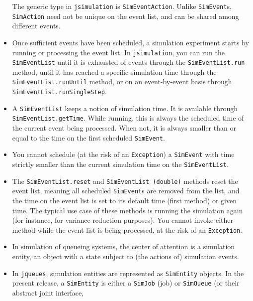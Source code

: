 \documentclass[12pt]{book}
\begin{document}
\begin{itemize}
        The generic type in \lstinline|jsimulation| is \lstinline|SimEventAction|.
        Unlike \lstinline|SimEvent|s, \lstinline|SimAction| need not be unique
          on the event list, and can be shared among different events.
  \item Once sufficient events have been scheduled,
          a simulation experiment starts by running or processing
          the event list.
        In \lstinline|jsimulation|,
          you can run the \lstinline|SimEventList| until it is exhausted
          of events through the \lstinline|SimEventList.run| method,
          until it has reached a specific simulation time
          through the \lstinline|SimEventList.runUntil| method,
          or on an event-by-event basis through \lstinline|SimEventList.runSingleStep|.
  \item A \lstinline|SimEventList| keeps a notion of simulation time.
        It is available through \lstinline|SimEventList.getTime|.
        While running,
          this is always the scheduled time of the current event being processed.
        When not, it is always smaller than or equal to the time
          on the first scheduled \lstinline|SimEvent|.
  \item You cannot schedule (at the risk of an \lstinline|Exception|)
          a \lstinline|SimEvent| with time
          strictly smaller than the current simulation time
          on the \lstinline|SimEventList|.
  \item The \lstinline|SimEventList.reset| and \lstinline|SimEventList (double)|
          methods reset the event list,
          meaning all scheduled \lstinline|SimEvent|s are removed from the list,
          and the time on the event list is set to its default time (first method)
          or given time.
        The typical use case of these methods is running the simulation again
          (for instance, for variance-reduction purposes).
        You cannot invoke either method while the event list is being processed,
          at the risk of an \lstinline|Exception|.
  \item In simulation of queueing systems,
          the center of attention is a simulation entity,
          an object with a state subject to (the actions of) simulation events.
  \item In \lstinline|jqueues|, simulation entities are represented
          as \lstinline|SimEntity| objects.
        In the present release,
          a \lstinline|SimEntity| is either a \lstinline|SimJob|
          (job) or \lstinline|SimQueue| (or their abstract joint interface,

\end{itemize}
\end{document}
